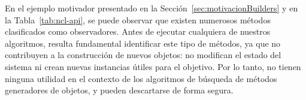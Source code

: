 




En el ejemplo motivador presentado en la Sección~\ref{sec:motivacionBuilders} y en la Tabla~\ref{tab:ncl-api}, se puede observar que existen numerosos métodos clasificados como observadores. 
Antes de ejecutar cualquiera de nuestros algoritmos, resulta fundamental identificar este tipo de métodos, ya que no contribuyen a la construcción de nuevos objetos: no modifican el estado del sistema ni crean nuevas instancias útiles para el objetivo. 
Por lo tanto, no tienen ninguna utilidad en el contexto de los algoritmos de búsqueda de métodos generadores de objetos, y pueden descartarse de forma segura.

